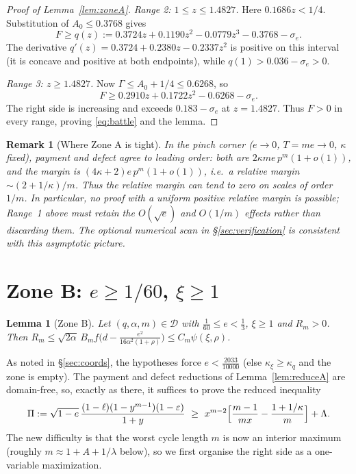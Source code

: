 \documentclass[11pt]{article}
\newtheorem{lemma}[theorem]{Lemma}
\newtheorem{remark}[theorem]{Remark}
\newcommand{\eps}{\varepsilon}
\begin{document}
\begin{proof}[Proof of Lemma~\ref{lem:zoneA}]
\smallskip\noindent
\emph{Range 2: $1\le z\le1.4827$.}
Here $0.1686z<1/4$.  Substitution of $A_0\le0.3768$ gives
\[
 F\ge q(z):=0.3724z+0.1190z^2-0.0779z^3-0.3768-\sigma_e.
\]
The derivative
$q'(z)=0.3724+0.2380z-0.2337z^2$ is positive on this interval
(it is concave and positive at both endpoints), while
$q(1)>0.036-\sigma_e>0$.

\smallskip\noindent
\emph{Range 3: $z\ge1.4827$.}
Now $\Gamma\le A_0+1/4\le0.6268$, so
\[
 F\ge0.2910z+0.1722z^2-0.6268-\sigma_e.
\]
The right side is increasing and exceeds $0.183-\sigma_e$ at $z=1.4827$.
Thus $F>0$ in every range, proving \eqref{eq:battle} and the lemma.
\end{proof}


\begin{remark}[Where Zone A is tight]\label{rmk:zoneA-tight}
In the pinch corner ($e\to0$, $T=me\to0$, $\kappa$ fixed), payment and defect
agree to leading order: both are $2\kappa m e\,p^m(1+o(1))$, and the margin is
$(4\kappa+2)e\,p^m(1+o(1))$, i.e.\ a relative margin $\sim(2+1/\kappa)/m$.
Thus the relative margin can tend to zero on scales of order $1/m$.
In particular, no proof with a uniform positive relative margin is possible;
Range~1 above must retain the $O(\sqrt e)$ and $O(1/m)$ effects rather than
discarding them.  The optional numerical scan in
\S\ref{sec:verification} is consistent with this asymptotic picture.
\end{remark}

\section{Zone B: \texorpdfstring{$e\ge1/60$, $\xi\ge1$}{e >= 1/60, xi >= 1}}\label{sec:zoneB}

\begin{lemma}[Zone B]\label{lem:zoneB}
Let $(q,\alpha,m)\in\mathcal D$ with $\tfrac1{60}\le e<\tfrac13$, $\xi\ge1$
and $R_m>0$.  Then
$R_m\le\sqrt{2\alpha}\,B_mf\bigl(d-\frac{e^2}{16\alpha^2(1+\rho)}\bigr)
\le C_m\psi(\xi,\rho)$.
\end{lemma}

As noted in \S\ref{sec:coords}, the hypotheses force $e<\tfrac{2033}{10000}$
(else $\kappa_\xi\ge\kappa_q$ and the zone is empty).  The payment and defect
reductions of Lemma~\ref{lem:reduceA} are domain-free, so, exactly as there,
it suffices to prove the reduced inequality
\begin{equation}\label{eq:reducedB}
        \Pi:=\sqrt{1-e}\,\frac{(1-\ell)(1-y^{m-1})(1-\eps)}{1+y}
        \ \ge\ x^{m-2}\Bigl[\frac{m-1}{mx}-\frac{1+1/\kappa}{m}\Bigr]+\Lambda .
\end{equation}
The new difficulty is that the worst cycle length $m$ is now an interior
maximum (roughly $m\approx1+A+1/\lambda$ below), so we first organise the
right side as a one-variable maximization.
\end{document}
